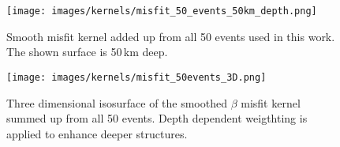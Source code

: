 \begin{figure}[h]
\begin{center}
\texttt{[image: images/kernels/misfit\_50\_events\_50km\_depth.png]}
\caption[Smooth misfit kernel for 50 events.]{Smooth misfit kernel added up from
all 50 events used in this work. The shown surface is 50$\,$km deep.}  
\label{misfit_50}
\end{center}
\end{figure}



\begin{figure}[h]
\begin{center}
\texttt{[image: images/kernels/misfit\_50events\_3D.png]}
\caption[3D isosurface of a misfit kernel for 50 events.]{Three dimensional isosurface of the smoothed $\beta$ 
misfit kernel summed up from all 50 events. Depth dependent weigthting is applied to enhance deeper structures.}  
\label{3d_misfit_50_isosurface}
\end{center}
\end{figure}